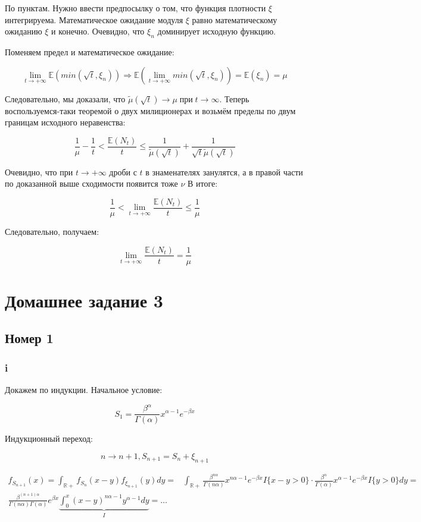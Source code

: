 \documentclass[a4paper,12pt]{article}
\def \mbb{\mathbb}
\def \R{\mbb R}
\def \E{\mbb{E}}
\begin{document}
По пунктам. Нужно ввести предпосылку о том, что функция плотности $ \xi $ интегрируема. Математическое ожидание модуля $ \xi $ равно математическому ожиданию $ \xi $ и конечно. Очевидно, что $ \xi_n $  доминирует исходную функцию.

Поменяем предел и математическое ожидание:

\[  \lim\limits_{t \rightarrow +\infty}   \E(min(\sqrt{t}, \xi_n)) \Rightarrow    \E( \lim\limits_{t \rightarrow +\infty}  min(\sqrt{t}, \xi_n)) = \E(\xi_n)  = \mu\]


Следовательно, мы доказали, что $\tilde{\mu}(\sqrt{t}) \rightarrow \mu \operatorname{ при } t \rightarrow \infty$. Теперь воспользуемся-таки теоремой о двух милиционерах и возьмём пределы по двум границам исходного неравенства:


\[ \frac{1}{\mu} - \frac{1 }{t}  < \frac{\E(N_t)}{t} \le \frac{1}{\tilde{\mu}(\sqrt{t})} +\frac{1}{\sqrt{t}\tilde{\mu}(\sqrt{t})} \]

Очевидно, что при $ t \to +\infty $ дроби с $ t $ в знаменателях занулятся, а в правой части по доказанной выше сходимости появится тоже $ \nu $ В итоге:

\[ \frac{1}{\mu}   <  \lim\limits_{t \rightarrow +\infty} \frac{\E(N_t)}{t} \le \frac{1}{\mu}  \]

Следовательно, получаем: 

\[  \lim\limits_{t \rightarrow +\infty} \frac{\E(N_t)}{t} = \frac{1}{\mu}    \]


\section{Домашнее задание 3}

\subsection{Номер 1}
\subsubsection{i}

Докажем по индукции. Начальное условие:

\[ S_1 = \frac{\beta^\alpha}{\Gamma(\alpha)} x^{\alpha-1} e^{-\beta x} \]

Индукционный переход:

\[ n \to n+1, S_{n+1} = S_n + \xi_{n+1} \]

\begin{equation}
\begin{aligned}
f_{S_{n+1}}(x) = \int_{\R+} f_{S_n}(x-y)f_{\xi_{n+1}}(y)dy = & \int_{\R+} \frac{\beta^{n\alpha}}{\Gamma(n\alpha)} x^{n\alpha-1} e^{-\beta x} I\{x-y>0\} \cdot \frac{\beta^\alpha}{\Gamma(\alpha)} x^{\alpha-1} e^{-\beta x} I\{y>0\} dy =\\
\frac{\beta^{(n+1)\alpha}}{\Gamma(n\alpha) \Gamma(\alpha)} e^{\beta x} \underbrace{ \int_{0}^{x} (x-y)^{n\alpha - 1} y^{\alpha-1} dy}_{I} =  \dots
\end{aligned}
\end{equation}
\end{document}
